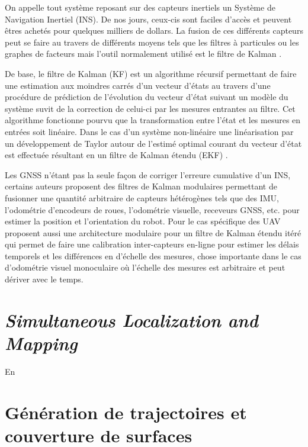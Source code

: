 On appelle tout système reposant sur des capteurs inertiels un Système de Navigation Inertiel (INS). De nos jours, ceux-cis sont faciles d'accès et peuvent êtres achetés pour quelques milliers de dollars. La fusion de ces différents capteurs peut se faire au travers de différents moyens tels que les filtres à particules \citep{Carvalho1997} ou les graphes de facteurs \citep{Indelman2012} mais l'outil normalement utilisé est le filtre de Kalman \citep{Noureldin2013}.

De base, le filtre de Kalman (KF) est un algorithme récursif permettant de faire une estimation aux moindres carrés d'un vecteur d'états au travers d'une procédure de prédiction de l'évolution du vecteur d'état suivant un modèle du système suvit de la correction de celui-ci par les mesures entrantes au filtre. Cet algorithme fonctionne pourvu que la transformation entre l'état et les mesures en entrées soit linéaire. Dans le cas d'un système non-linéaire une linéarisation par un développement de Taylor autour de l'estimé optimal courant du vecteur d'état est effectuée résultant en un filtre de Kalman étendu (EKF) \citep{Chui2017}.

Les GNSS n'étant pas la seule façon de corriger l'erreure cumulative d'un INS, certains auteurs proposent des filtres de Kalman modulaires permettant de fusionner une quantité arbitraire de capteurs hétérogènes tels que des IMU, l'odométrie d'encodeurs de roues, l'odométrie visuelle, receveurs GNSS, etc. \citep{MooreEkf2014} pour estimer la position et l'orientation du robot. Pour le cas spécifique des UAV \citep{Lynen2013} proposent aussi une architecture modulaire pour un filtre de Kalman étendu itéré qui permet de faire une calibration inter-capteurs en-ligne pour estimer les délais temporels et les différences en d'échelle des mesures, chose importante dans le cas d'odométrie visuel monoculaire où l'échelle des mesures est arbitraire et peut dériver avec le temps.

\section{\textit{Simultaneous Localization and Mapping}}\label{subsec:reconstruction}

En

\section{Génération de trajectoires et couverture de surfaces}\label{subsec:generation}

